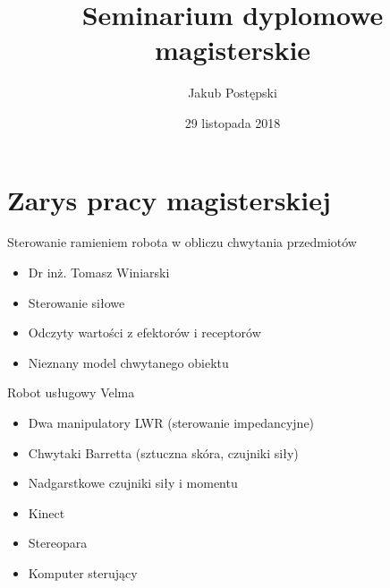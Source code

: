 \documentclass{beamer}
\begin{document}
\title{Seminarium dyplomowe magisterskie}
\author{Jakub Postępski}
\date{29 listopada 2018}

\frame{\titlepage}

\section{Zarys pracy magisterskiej}
\begin{frame}{Sterowanie ramieniem robota w obliczu chwytania przedmiotów}

\begin{itemize}
\item Dr inż. Tomasz Winiarski
\end{itemize}

\begin{itemize}
\item Sterowanie siłowe
\item Odczyty wartości z efektorów i receptorów
\item Nieznany model chwytanego obiektu
\end{itemize}
\end{frame}


\begin{frame}{Robot usługowy Velma}
\begin{itemize}
\item Dwa manipulatory LWR (sterowanie impedancyjne)
\item Chwytaki Barretta (sztuczna skóra, czujniki siły)
\item Nadgarstkowe czujniki siły i momentu 
\item Kinect
\item Stereopara
\item Komputer sterujący
\end{itemize}
\end{frame}
\end{document}
